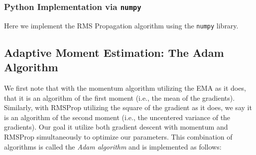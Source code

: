 \subsubsection{Python Implementation via \texttt{numpy}}
Here we implement the RMS Propagation algorithm using the \texttt{numpy} library.





\subsection{Adaptive Moment Estimation: The Adam Algorithm}

We first note that with the momentum algorithm utilizing the EMA as it does, that it is an algorithm of the first moment (i.e., the mean of the gradients).  Similarly, with RMSProp utilizing the square of the gradient as it does, we say it is an algorithm of the second moment (i.e., the uncentered variance of the gradients).  Our goal it utilize both gradient descent with momentum and RMSProp simultaneously to optimize our parameters.  This combination of algorithms is called the \textit{Adam algorithm} and is implemented as follows:
